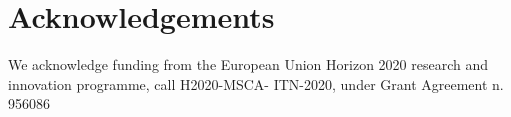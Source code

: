 \documentclass{webofc}
\begin{document}












\section*{Acknowledgements}
We acknowledge funding from the European Union Horizon 2020 research and innovation programme, call H2020-MSCA- ITN-2020, under Grant Agreement n. 956086


\end{document}
